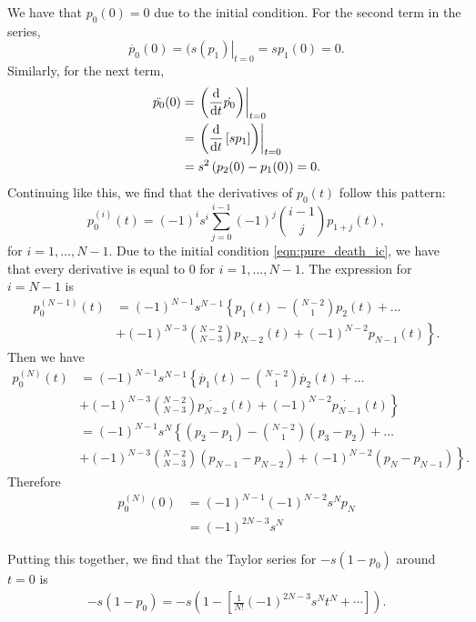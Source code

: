 We have that \(p_0(0) = 0\) due to the initial condition. For the second term in
the series,
\begin{equation*}
    \dot{p_0}(0) = \left.(s(p_1)\right|_{t=0} = sp_1(0) = 0.
\end{equation*}
Similarly, for the next term,
\begin{align*}
    \ddot{p_0}(0) &= \left.\left(\frac{\mathrm{d} }{\mathrm{d} t}\dot{p_0}\right)\right|_{t=0}\\
    &= \left.\left(\frac{\mathrm{d} }{\mathrm{d} t}\left[s p_1\right]\right)\right|_{t=0}\\
    &= s^2\left(p_2(0) - p_1(0)\right) = 0.
\end{align*}
Continuing like this, we find that the derivatives of \(p_0(t)\) follow this
pattern:
\begin{equation*}
    p_0^{(i)}(t) = (-1)^i s^i \sum_{j=0}^{i-1}(-1)^j
    \binom{i-1}{j} p_{1+j}(t),
\end{equation*}
for \(i=1,\dotsc,N-1\).
Due to the initial condition \eqref{eqn:pure_death_ic}, we have that every
derivative is equal to \(0\) for \(i=1,\dotsc,N-1\). The expression for
\(i=N-1\) is
\begin{align*}
    p_0^{(N-1)}(t) &= (-1)^{N-1} s^{N-1} \left\{ p_1(t) - \binom{N-2}{1}p_2(t) +
    \dotsc \right.\\
    &\left.+ (-1)^{N-3} \binom{N-2}{N-3} p_{N-2}(t) +
    (-1)^{N-2}p_{N-1}(t)\right\}.
\end{align*}
Then we have
\begin{align*}
    p_0^{(N)}(t) &= (-1)^{N-1} s^{N-1} \left\{ \dot{p_1}(t) -
    \binom{N-2}{1}\dot{p_2}(t) +
    \dotsc \right.\\
    &\left.+ (-1)^{N-3} \binom{N-2}{N-3} \dot{p_{N-2}}(t) +
    (-1)^{N-2}\dot{p_{N-1}}(t)\right\}\\
    &= (-1)^{N-1} s^{N} \left\{ (p_2-p_1) -
    \binom{N-2}{1}(p_3-p_2) +
    \dotsc \right.\\
    &\left.+ (-1)^{N-3} \binom{N-2}{N-3} (p_{N-1} - p_{N-2}) +
    (-1)^{N-2} (p_N - p_{N-1})\right\}.
\end{align*}
Therefore
\begin{align*}
    p_0^{(N)}(0) &= (-1)^{N-1} (-1)^{N-2} s^N p_N\\
    &= (-1)^{2N-3} s^N
\end{align*}

Putting this together, we find that the Taylor series for \(-s(1-p_0)\) around
\(t=0\) is
\begin{align*}
    -s(1-p_0) = -s\left(1 - \left[ \frac{1}{N!}(-1)^{2N-3}s^N t^N + \dotsb
    \right] \right).
\end{align*}

